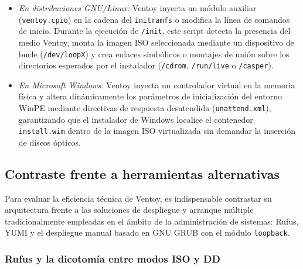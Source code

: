 \documentclass[12pt]{article}
\begin{document}
\begin{itemize}[noitemsep, topsep=2pt]
    \begin{itemize}[noitemsep, topsep=1pt]
        \item \textit{En distribuciones GNU/Linux:} Ventoy inyecta un módulo auxiliar (\texttt{ventoy.cpio}) en la cadena del \texttt{initramfs} o modifica la línea de comandos de inicio. Durante la ejecución de \texttt{/init}, este script detecta la presencia del medio Ventoy, monta la imagen ISO seleccionada mediante un dispositivo de bucle (\texttt{/dev/loopX}) y crea enlaces simbólicos o montajes de unión sobre los directorios esperados por el instalador (\texttt{/cdrom}, \texttt{/run/live} o \texttt{/casper}).
        \item \textit{En Microsoft Windows:} Ventoy inyecta un controlador virtual en la memoria física y altera dinámicamente los parámetros de inicialización del entorno WinPE mediante directivas de respuesta desatendida (\texttt{unattend.xml}), garantizando que el instalador de Windows localice el contenedor \texttt{install.wim} dentro de la imagen ISO virtualizada sin demandar la inserción de discos ópticos.
    \end{itemize}
\end{itemize}

\subsection{Contraste frente a herramientas alternativas}
\label{sec:contrasteHerramientas}

Para evaluar la eficiencia técnica de Ventoy, es indispensable contrastar su arquitectura frente a las soluciones de despliegue y arranque múltiple tradicionalmente empleadas en el ámbito de la administración de sistemas: Rufus, YUMI y el despliegue manual basado en GNU GRUB con el módulo \texttt{loopback}.

\subsubsection{Rufus y la dicotomía entre modos ISO y DD}
\end{document}
